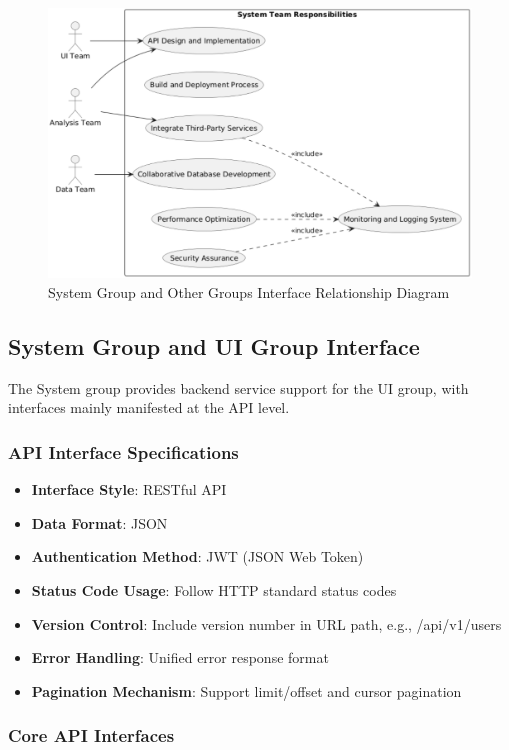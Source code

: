 \documentclass[a4paper,12pt]{article}
\begin{document}
\begin{figure}[H]
    \centering
    \includegraphics[width=0.8\linewidth]{assets/image2_EG.png}
    \caption{System Group and Other Groups Interface Relationship Diagram}
    \label{fig:interface-relations}
\end{figure}

\subsection{System Group and UI Group Interface}

The System group provides backend service support for the UI group, with interfaces mainly manifested at the API level.

\subsubsection{API Interface Specifications}

\begin{itemize}
  \item \textbf{Interface Style}: RESTful API
  \item \textbf{Data Format}: JSON
  \item \textbf{Authentication Method}: JWT (JSON Web Token)
  \item \textbf{Status Code Usage}: Follow HTTP standard status codes
  \item \textbf{Version Control}: Include version number in URL path, e.g., /api/v1/users
  \item \textbf{Error Handling}: Unified error response format
  \item \textbf{Pagination Mechanism}: Support limit/offset and cursor pagination
\end{itemize}

\subsubsection{Core API Interfaces}
\end{document}
